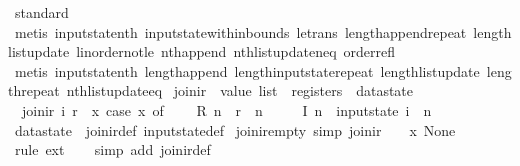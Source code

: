 \begin{isabellebody}
\ standard\isanewline
\ \ \isamarkupfalse%
\ {\isacharparenleft}metis\ input{}state{\isacharunderscore}nth\ input{}state{\isacharunderscore}within{\isacharunderscore}bounds\ le{\isacharunderscore}trans\ length{\isacharunderscore}append{\isacharunderscore}repeat\ length{\isacharunderscore}list{\isacharunderscore}update\ linorder{\isacharunderscore}not{\isacharunderscore}le\ nth{\isacharunderscore}append\ nth{\isacharunderscore}list{\isacharunderscore}update{\isacharunderscore}neq\ order{\isacharunderscore}refl{\isacharparenright}\isanewline
\ \ \isamarkupfalse%
\ {\isacharparenleft}metis\ input{}state{\isacharunderscore}nth\ length{\isacharunderscore}append\ length{\isacharunderscore}input{}state{\isacharunderscore}repeat\ length{\isacharunderscore}list{\isacharunderscore}update\ length{\isacharunderscore}repeat\ nth{\isacharunderscore}list{\isacharunderscore}update{\isacharunderscore}eq{\isacharparenright}%
\endisatagproof
{\isafoldproof}%
%
\isadelimproof
\isanewline
%
\endisadelimproof
\isanewline
{}\isamarkupfalse%
\ join{\isacharunderscore}ir\ {\isacharcolon}{\isacharcolon}\ {\isachardoublequoteopen}value\ list\ {\isasymRightarrow}\ registers\ {\isasymRightarrow}\ datastate{\isachardoublequoteclose}\ \isanewline
\ \ {\isachardoublequoteopen}join{\isacharunderscore}ir\ i\ r\ {\isasymequiv}\ {\isacharparenleft}{\isasymlambda}x{\isachardot}\ case\ x\ of\isanewline
\ \ \ \ R\ n\ {\isasymRightarrow}\ r\ {\isachardollar}\ n\ {\isacharbar}\isanewline
\ \ \ \ I\ n\ {\isasymRightarrow}\ {\isacharparenleft}input{}state\ i{\isacharparenright}\ {\isachardollar}\ n\isanewline
\ \ {\isacharparenright}{\isachardoublequoteclose}\isanewline
\isanewline
{}\isamarkupfalse%
\ datastate\ {\isacharequal}\ join{\isacharunderscore}ir{\isacharunderscore}def\ input{}state{\isacharunderscore}def\isanewline
\isanewline
{}\isamarkupfalse%
\ join{\isacharunderscore}ir{\isacharunderscore}empty\ {\isacharbrackleft}simp{\isacharbrackright}{\isacharcolon}\ {\isachardoublequoteopen}join{\isacharunderscore}ir\ {\isacharbrackleft}{\isacharbrackright}\ {\isacharless}{\isachargreater}\ {\isacharequal}\ {\isacharparenleft}{\isasymlambda}x{\isachardot}\ None{\isacharparenright}{\isachardoublequoteclose}\isanewline
%
\isadelimproof
\ \ %
\endisadelimproof
%
\isatagproof
{}\isamarkupfalse%
\ {\isacharparenleft}rule\ ext{\isacharparenright}\isanewline
\ \ \isamarkupfalse%
\ {\isacharparenleft}simp\ add{\isacharcolon}\ join{\isacharunderscore}ir{\isacharunderscore}def{\isacharparenright}\isanewline

\end{isabellebody}
